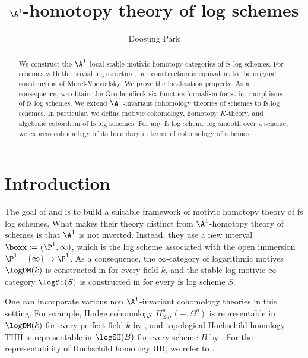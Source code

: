 \documentclass[10pt]{amsart}
\begin{document}
\title{$\A^1$-homotopy theory of log schemes}
\author{Doosung Park}
\address{Bergische Universit{\"a}t Wuppertal,
Fakult{\"a}t Mathematik und Naturwissenschaften
\\
Gau{\ss}strasse 20, 42119 Wuppertal, Germany}
\begin{abstract}
We construct the $\A^1$-local stable motivic homotopy categories of fs log schemes.
For schemes with the trivial log structure, our construction is equivalent to the original construction of Morel-Voevodsky.
We prove the localization property.
As a consequence, we obtain the Grothendieck six functors formalism for strict morphisms of fs log schemes.
We extend $\A^1$-invariant cohomology theories of schemes to fs log schemes.
In particular, we define motivic cohomology, homotopy $K$-theory, and algebraic cobordism of fs log schemes.
For any fs log scheme log smooth over a scheme, we express cohomology of its boundary in terms of cohomology of schemes.
\end{abstract}
\maketitle


\section{Introduction}

The goal of \cite{logDM} and \cite{logSH} is to build a suitable framework of motivic homotopy theory of fs log schemes.
What makes their theory distinct from $\A^1$-homotopy theory of schemes \cite{MV} is that $\A^1$ is not inverted.
Instead, they use a new interval $\boxx:=(\P^1,\infty)$, which is the log scheme associated with the open immersion $\P^1-\{\infty\}\to \P^1$.
As a consequence, the $\infty$-category of logarithmic motives $\logDM(k)$ is constructed in \cite{logDM} for every field $k$, and the stable log motivic $\infty$-category $\logSH(S)$ is constructed in \cite{logSH} for every fs log scheme $S$.


One can incorporate various non $\A^1$-invariant cohomology theories in this setting.
For example, Hodge cohomology $H_{Zar}^p(-,\Omega^q)$ is representable in $\logDM(k)$  for every perfect field $k$ by \cite[Theorem 9.7.1]{logDM}, and topological Hochschild homology $\mathrm{THH}$ is representable in $\logSH(B)$ for every scheme $B$ by \cite{logSH}.
For the representability of Hochschild homology $\mathrm{HH}$, we refer to \cite{BLPO}.
\end{document}
